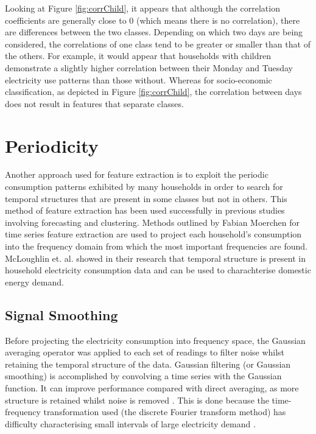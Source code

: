 \corrChild %

Looking at Figure \ref{fig:corrChild}, it appears that although the correlation coefficients are generally close to 0 (which means there is no correlation), there are differences between the two classes. Depending on which two days are being considered, the correlations of one class tend to be greater or smaller than that of the others. For example, it would appear that households with children demonstrate a slightly higher correlation between their Monday and Tuesday electricity use patterns than those without. Whereas for socio-economic classification, as depicted in Figure \ref{fig:corrChild}, the correlation between days does not result in features that separate classes.

\corrSocio %


\section{Periodicity}

Another approach used for feature extraction is to exploit the periodic consumption patterns exhibited by many households in order to search for temporal structures that are present in some classes but not in others. This method of feature extraction has been used successfully in previous studies involving forecasting and clustering. Methods outlined by Fabian Moerchen \cite{Moerchen} for time series feature extraction are used to project each household's consumption into the frequency domain from which the most important frequencies are found. McLoughlin et. al. \cite{McLoughlin} showed in their research that temporal structure is present in household electricity consumption data and can be used to charachterise domestic energy demand.


\subsection*{Signal Smoothing}

Before projecting the electricity consumption into frequency space, the Gaussian averaging operator was applied to each set of readings to filter noise whilst retaining the temporal structure of the data. Gaussian filtering (or Gaussian smoothing) is accomplished by convolving a time series with the Gaussian function. It can improve performance compared with direct averaging, as more structure is retained whilst noise is removed \cite{Nixon}. This is done because the time-frequency transformation used (the discrete Fourier transform method) has difficulty characterising small intervals of large electricity demand \cite{Graps}.



